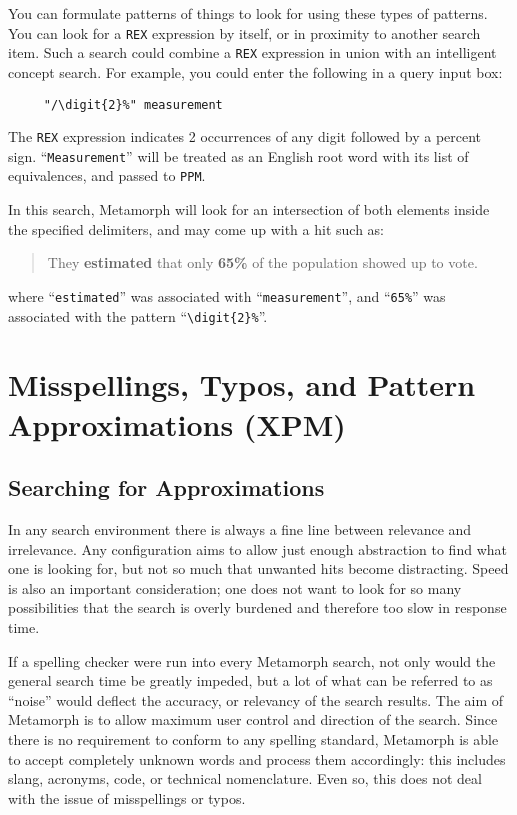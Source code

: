 You can formulate patterns of things to look for using these types of
patterns.  You can look for a \verb`REX` expression by itself, or in
proximity to another search item.  Such a search could combine a
\verb`REX` expression in union with an intelligent concept search.
For example, you could enter the following in a query input box:

\begin{verbatim}
     "/\digit{2}%" measurement
\end{verbatim}

The \verb`REX` expression indicates 2 occurrences of any digit
followed by a percent sign.  ``\verb`Measurement`'' will be treated as
an English root word with its list of equivalences, and passed to
\verb`PPM`.

In this search, Metamorph will look for an intersection of both
elements inside the specified delimiters, and may come up with a hit
such as:

\begin{quote}

     They {\bf estimated} that only {\bf 65\%} of the population
     showed up to vote.

\end{quote}

where ``\verb`estimated`'' was associated with ``\verb`measurement`'',
and ``\verb`65%`'' was associated with the pattern
``\verb`\digit{2}%`''.

\section{Misspellings, Typos, and Pattern Approximations (XPM)}

\subsection{Searching for Approximations}

In any search environment there is always a fine line between
relevance and irrelevance.  Any configuration aims to allow just
enough abstraction to find what one is looking for, but not so much
that unwanted hits become distracting.  Speed is also an important
consideration; one does not want to look for so many possibilities
that the search is overly burdened and therefore too slow in response
time.

If a spelling checker were run into every Metamorph search, not only
would the general search time be greatly impeded, but a lot of what
can be referred to as ``noise'' would deflect the accuracy, or
relevancy of the search results.  The aim of Metamorph is to allow
maximum user control and direction of the search.  Since there is no
requirement to conform to any spelling standard, Metamorph is able to
accept completely unknown words and process them accordingly:  this
includes slang, acronyms, code, or technical nomenclature.  Even so,
this does not deal with the issue of misspellings or typos.

